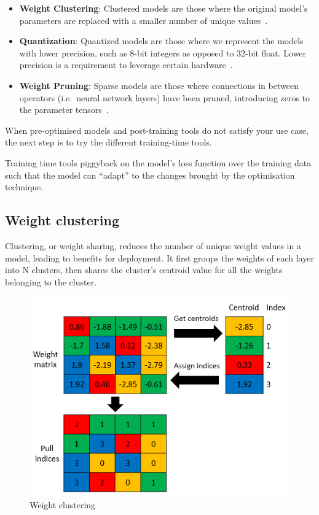 \begin{itemize}
    \item \textbf{Weight Clustering}: Clustered models are those where the
        original model's parameters are replaced with a smaller number of
        unique values~\cite{tfmot:intro}.
    \item \textbf{Quantization}: Quantized models are those where we represent
        the models with lower precision, such as 8-bit integers as opposed to
        32-bit float. Lower precision is a requirement to leverage certain
        hardware~\cite{tfmot:intro}.
    \item \textbf{Weight Pruning}: Sparse models are those where connections in
        between operators (i.e.\ neural network layers) have been pruned,
        introducing zeros to the parameter tensors~\cite{tfmot:intro}.
\end{itemize}

When pre-optimised models and post-training tools do not satisfy your use case,
the next step is to try the different training-time tools.

Training time tools piggyback on the model's loss function over the training
data such that the model can ``adapt'' to the changes brought by the
optimisation technique.~\cite{tfmot:intro}

\subsection{Weight clustering}
Clustering, or weight sharing, reduces the number of unique weight values in a
model, leading to benefits for deployment. It first groups the weights of each
layer into N clusters, then shares the cluster's centroid value for all the
weights belonging to the cluster.

\begin{figure}[ht]
    \includegraphics[width=\textwidth]{images/introduction/weight_clustering.png}
    \centering
    \caption{Weight clustering}\label{fig:weight_clustering}
\end{figure}

